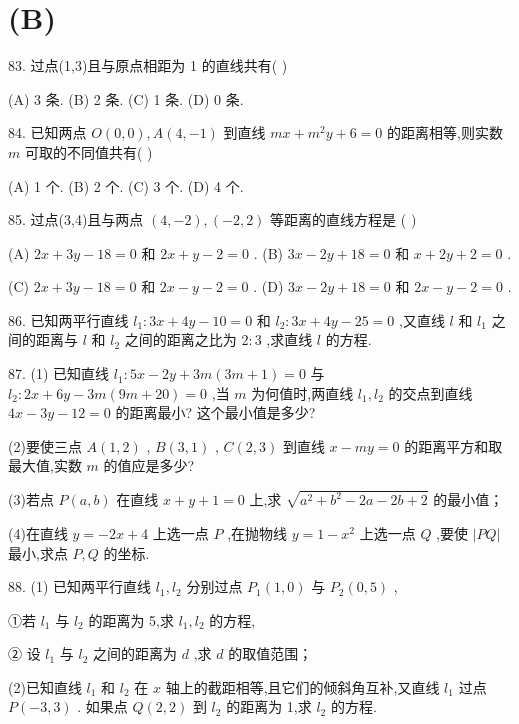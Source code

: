 \section*{(B)}

83. 过点(1,3)且与原点相距为 1 的直线共有(   )

(A) 3 条. (B) 2 条. (C) 1 条. (D) 0 条.

84. 已知两点 $O\left( {0,0}\right) ,A\left( {4, - 1}\right)$ 到直线 ${mx} + {m}^{2}y + 6 = 0$ 的距离相等,则实数 $m$ 可取的不同值共有(   )

(A) 1 个. (B) 2 个. (C) 3 个. (D) 4 个.

85. 过点(3,4)且与两点 $\left( {4, - 2}\right) ,\left( {-2,2}\right)$ 等距离的直线方程是 (   )

(A) ${2x} + {3y} - {18} = 0$ 和 ${2x} + y - 2 = 0$ . (B) ${3x} - {2y} + {18} = 0$ 和 $x + {2y} + 2 = 0$ .

(C) ${2x} + {3y} - {18} = 0$ 和 ${2x} - y - 2 = 0$ . (D) ${3x} - {2y} + {18} = 0$ 和 ${2x} - y - 2 = 0$ .

86. 已知两平行直线 ${l}_{1} : {3x} + {4y} - {10} = 0$ 和 ${l}_{2} : {3x} + {4y} - {25} = 0$ ,又直线 $l$ 和 ${l}_{1}$ 之间的距离与 $l$ 和 ${l}_{2}$ 之间的距离之比为 $2 : 3$ ,求直线 $l$ 的方程.

87. (1) 已知直线 ${l}_{1} : {5x} - {2y} + {3m}\left( {{3m} + 1}\right)  = 0$ 与 ${l}_{2} : {2x} + {6y} - {3m}\left( {{9m} + {20}}\right)  = 0$ ,当 $m$ 为何值时,两直线 ${l}_{1},{l}_{2}$ 的交点到直线 ${4x} - {3y} - {12} = 0$ 的距离最小? 这个最小值是多少?

(2)要使三点 $A\left( {1,2}\right)$ , $B\left( {3,1}\right)$ , $C\left( {2,3}\right)$ 到直线 $x - {my} = 0$ 的距离平方和取最大值,实数 $m$ 的值应是多少?

(3)若点 $P\left( {a,b}\right)$ 在直线 $x + y + 1 = 0$ 上,求 $\sqrt{{a}^{2} + {b}^{2} - {2a} - {2b} + 2}$ 的最小值；

(4)在直线 $y =  - {2x} + 4$ 上选一点 $P$ ,在抛物线 $y = 1 - {x}^{2}$ 上选一点 $Q$ ,要使 $\left| {PQ}\right|$ 最小,求点 $P,Q$ 的坐标.

88. (1) 已知两平行直线 ${l}_{1},{l}_{2}$ 分别过点 ${P}_{1}\left( {1,0}\right)$ 与 ${P}_{2}\left( {0,5}\right)$ ,

①若 ${l}_{1}$ 与 ${l}_{2}$ 的距离为 5,求 ${l}_{1},{l}_{2}$ 的方程,

② 设 ${l}_{1}$ 与 ${l}_{2}$ 之间的距离为 $d$ ,求 $d$ 的取值范围；

(2)已知直线 ${l}_{1}$ 和 ${l}_{2}$ 在 $x$ 轴上的截距相等,且它们的倾斜角互补,又直线 ${l}_{1}$ 过点 $P\left( {-3,3}\right)$ . 如果点 $Q\left( {2,2}\right)$ 到 ${l}_{2}$ 的距离为 1,求 ${l}_{2}$ 的方程.

